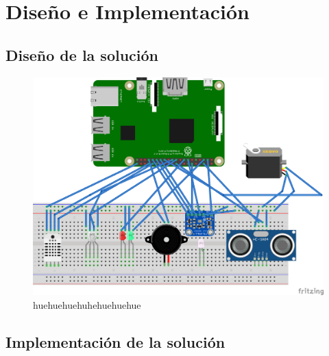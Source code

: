 

\chapter{Diseño e Implementación}

\section{Diseño de la solución}

\begin{figure}[htb]
\centering
\includegraphics[scale=0.4]{./Figuras/rpi3javier.png}
\caption{huehuehuehuhehuehuehue}
\label{fig:hue}
\vspace*{-10pt}
\end{figure}

\section{Implementación de la solución}
